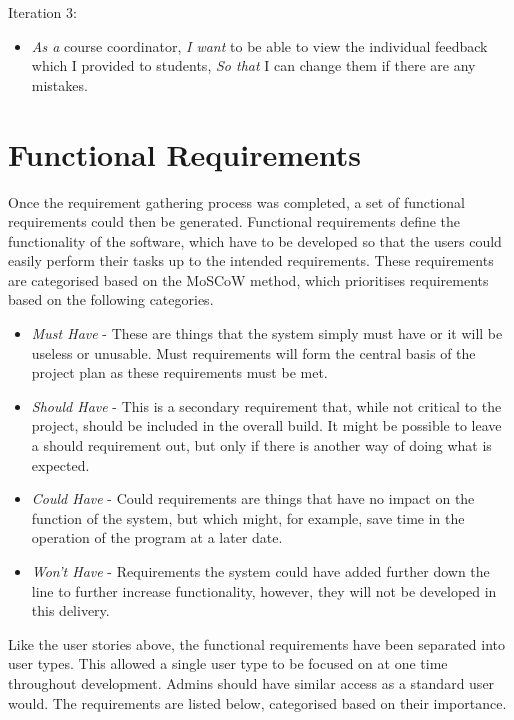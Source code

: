 \documentclass{l4proj}
\begin{document}
Iteration 3:

\begin{itemize}
    \item
    \emph{As a} course coordinator, \emph{I want} to be able to view the individual feedback which I provided to students, \emph{So that} I can change them if there are any mistakes.
\end{itemize}


\section{Functional Requirements}

Once the requirement gathering process was completed, a set of functional requirements could then be generated. Functional requirements define the functionality of the software, which have to be developed so that the users could easily perform their tasks up to the intended requirements. These requirements are categorised based on the MoSCoW method, which prioritises requirements based on the following categories.

\begin{itemize}
    \item
    \emph{Must Have} - These are things that the system simply must have or it will be useless or unusable. Must requirements will form the central basis of the project plan as these requirements must be met.
    \item
    \emph{Should Have} - This is a secondary requirement that, while not critical to the project, should be included in the overall build. It might be possible to leave a should requirement out, but only if there is another way of doing what is expected.
    \item
    \emph{Could Have} - Could requirements are things that have no impact on the function of the system, but which might, for example, save time in the operation of the program at a later date.
    \item
    \emph{Won't Have} - Requirements the system could have added further down the line to further increase functionality, however, they will not be developed in this delivery.
\end{itemize}

Like the user stories above, the functional requirements have been separated into user types. This allowed a single user type to be focused on at one time throughout development. Admins should have similar access as a standard user would. The requirements are listed below, categorised based on their importance. 
\end{document}
